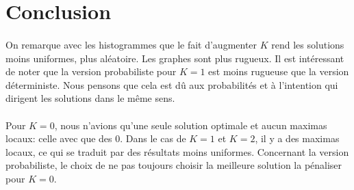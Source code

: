 \documentclass[a4paper, 11pt]{article}
\begin{document}
\section{Conclusion}
\paragraph{}
On remarque avec les histogrammes que le fait d'augmenter $K$ rend les solutions moins uniformes, plus aléatoire. Les graphes sont
plus rugueux. 
Il est intéressant de noter que la version probabiliste pour $K=1$ est moins rugueuse que la version déterministe. Nous pensons que 
cela est dû aux probabilités et à l'intention qui dirigent les solutions dans le même sens.
\paragraph{}
Pour $K=0$, nous n'avions qu'une seule solution optimale et aucun maximas locaux: celle avec que des $0$. Dans le cas de $K=1$ et $K=2$,
il y a des maximas locaux, ce qui se traduit par des résultats moins uniformes.
Concernant la version probabiliste, le choix de ne pas toujours choisir la meilleure solution la pénaliser pour $K=0$.
\end{document}
